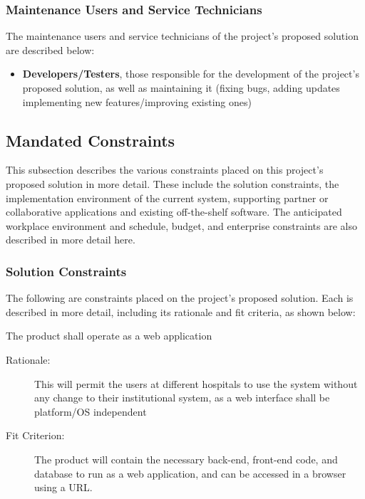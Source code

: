 \documentclass[12pt]{article}
\begin{document}
\subsubsection{Maintenance Users and Service Technicians}
The maintenance users and service technicians of the project’s proposed solution are described below:
\begin{itemize}
    \item \textbf{Developers/Testers}, those responsible for the development of the project’s proposed solution, as well as maintaining it (fixing bugs, adding updates implementing new features/improving existing ones) 
\end{itemize}

\subsection{Mandated Constraints}
This subsection describes the various constraints placed on this project's proposed solution in more detail. These include the solution constraints, the implementation environment of the current system, supporting partner or collaborative applications and existing off-the-shelf software. The anticipated workplace environment and schedule, budget, and enterprise constraints are also described in more detail here.

\subsubsection{Solution Constraints}
The following are constraints placed on the project’s proposed solution. Each is described in more detail, including its rationale and fit criteria, as shown below:
\begin{enumerate}[label=MC\arabic*., series=mc]
    \begin{item}
        The product shall operate as a web application
        \begin{description} 
            \item[Rationale:] This will permit the users at different hospitals to use the system without any change to their institutional system, as a web interface shall be platform/OS independent
            \item[Fit Criterion:] The product will contain the necessary back-end, front-end code, and database to run as a web application, and can be accessed in a browser using a URL.
        \end{description}
    \end{item}
\end{enumerate}
\end{document}

